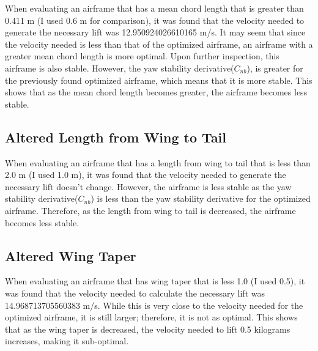 \documentclass{journal}
\begin{document}
	When evaluating an airframe that has a mean chord length that is greater than 0.411 m (I used 0.6 m for comparison), it was found that the velocity needed to generate the necessary lift was 12.950924026610165 m/s. It may seem that since the velocity needed is less than that of the optimized airframe, an airframe with a greater mean chord length is more optimal. Upon further inspection, this airframe is also stable. However, the yaw stability derivative(\(C_{nb}\)), is greater for the previously found optimized airframe, which means that it is more stable. This shows that as the mean chord length becomes greater, the airframe becomes less stable.
	
	\subsection{Altered Length from Wing to Tail}
	
	When evaluating an airframe that has a length from wing to tail that is less than 2.0 m (I used 1.0 m), it was found that the velocity needed to generate the necessary lift doesn't change. However, the airframe is less stable as the yaw stability derivative(\(C_{nb}\)) is less than the yaw stability derivative for the optimized airframe. Therefore, as the length from wing to tail is decreased, the airframe becomes less stable.
	
	\subsection{Altered Wing Taper}
	
	When evaluating an airframe that has wing taper that is less 1.0 (I used 0.5), it was found that the velocity needed to calculate the necessary lift was 14.968713705560383 m/s. While this is very close to the velocity needed for the optimized airframe, it is still larger; therefore, it is not as optimal. This shows that as the wing taper is decreased, the velocity needed to lift 0.5 kilograms increases, making it sub-optimal.
	
\end{document}
